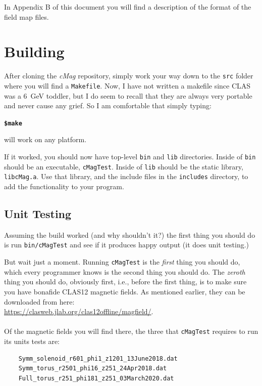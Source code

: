\documentclass{article}
\begin{document}
In Appendix B of this document you will find a description of the format of the field map files.


\section {Building}
After cloning the \textit{cMag} repository, simply work your way down to the \texttt{src} folder where you will find a \texttt{Makefile}. Now, I have not written a makefile since CLAS was a 6\ GeV toddler, but I do seem to recall that they are always very portable and never cause any grief. So I am comfortable that simply typing:

\textbf{\texttt{\$make}}

will work on any platform. 

If it worked, you should now have top-level \texttt{bin} and \texttt{lib} directories. Inside of \texttt{bin} should be an executable, \texttt{cMagTest}. Inside of \texttt{lib} should be the static library, \texttt {libcMag.a}. Use that library, and the include files in the \texttt{includes} directory, to add the  functionality to your program.


\subsection {Unit Testing}
Assuming the build worked (and why shouldn't it?) the first thing you should do is run \texttt{bin/cMagTest} and see if it produces happy output (it does unit testing.) 

But wait just a moment. Running  \texttt{cMagTest} is the \textit{first} thing you should do, which every programmer knows is the second thing you should do. The \textit{zeroth} thing you should do, obviously first, i.e., before the first thing, is to make sure you have bonafide CLAS12 magnetic fields.  As mentioned earlier, they can be downloaded from here:\\

 \url{https://clasweb.jlab.org/clas12offline/magfield/}.\\
\vspace{0.25mm}\\
Of the magnetic fields you will find there, the three that \texttt{cMagTest}  requires to run its units tests are:\\
\begin{verbatim}
    Symm_solenoid_r601_phi1_z1201_13June2018.dat
    Symm_torus_r2501_phi16_z251_24Apr2018.dat
    Full_torus_r251_phi181_z251_03March2020.dat
\end{verbatim} 
\vspace{1.5mm}
\end{document}
